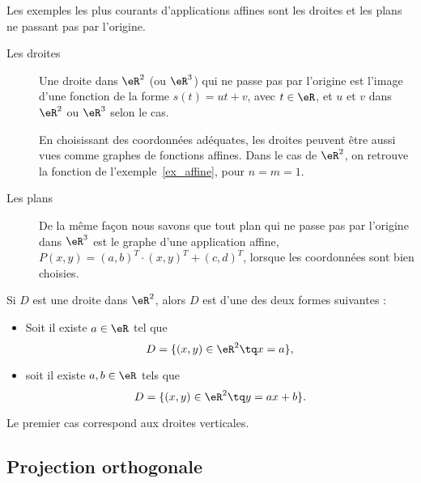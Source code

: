 \begin{example}
	Les exemples les plus courants d'applications affines sont les droites et les plans ne passant pas par l'origine.
	\begin{description}
		\item[Les droites] Une droite dans $\eR^2$ (ou $\eR^3$) qui ne passe pas par l'origine est l'image d'une fonction de la forme $s(t) =u t +v$, avec $t \in \eR$, et $u$ et $v$ dans $\eR^2$ ou $\eR^3$ selon le cas. 

		En choisissant des coordonnées adéquates, les droites peuvent être aussi vues comme graphes de fonctions affines. Dans le cas de $\eR^2$, on retrouve la fonction de l'exemple~\ref{ex_affine}, pour \( n = m = 1 \).

		\item[Les plans]
			De la même façon nous savons que tout plan qui ne passe pas par l'origine dans $\eR^3$ est le graphe d'une application affine, $P(x,y)= (a,b)^T\cdot(x,y)^T+(c,d)^T$, lorsque les coordonnées sont bien choisies.
	\end{description}
\end{example}

\begin{lemma}       \label{LEMooYIHXooEwmlPo}
    Si \( D\) est une droite dans \( \eR^2\), alors \( D\) est d'une des deux formes suivantes :
    \begin{itemize}
        \item Soit il existe \( a\in \eR\) tel que
            \begin{equation}
                D=\{ (x,y)\in \eR^2\tq x=a \},
            \end{equation}
        \item soit il existe \( a,b\in \eR\) tels que
            \begin{equation}
                D=\{ (x,y)\in \eR^2\tq y=ax+b \}.
            \end{equation}
    \end{itemize}
    Le premier cas correspond aux droites verticales.
\end{lemma}

\subsection{Projection orthogonale}

